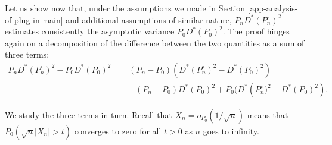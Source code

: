 \documentclass[11pt,openright,twoside]{book}
\newcommand{\Phat}{P^{\circ}}
\theoremstyle{definition}
\theoremstyle{definition}
\theoremstyle{definition}
\theoremstyle{remark}
\begin{document}
Let us show now that, under the assumptions we made in Section
\ref{app-analysis-of-plug-in-main} and additional assumptions of similar
nature, \(P_{n} D^{*} (\Phat_n)^2\) estimates consistently the asymptotic
variance \(P_{0} D^{*} (P_{0})^2\). The proof hinges again on a decomposition
of the difference between the two quantities as a sum of three terms:
\begin{align}  P_{n} D^{*}  (\Phat_n)^2 -  P_{0} D^{*}  (P_{0})^2= &  (P_{n} -
P_{0}) \left(D^{*} (\Phat_n)^2 - D^{*}  (P_{0})^2\right)\\ & + (P_{n} - P_{0})
D^{*}  (P_{0})^2 +  P_{0}  (D^{*} \left(\Phat_n)^2  - D^{*}  (P_{0})^2\right).
\end{align}

We study the three terms in turn. Recall that \(X_n = o_{P_0}(1/\sqrt{n})\)
means that \(P_0(\sqrt{n}|X_n| > t)\) converges to zero for all \(t>0\) as \(n\)
goes to infinity.
\end{document}
